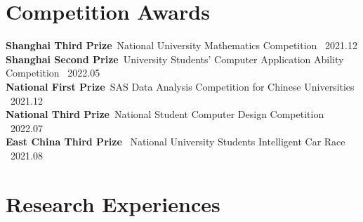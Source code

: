 \documentclass{resume}
\begin{document}
\section{Competition Awards}
\textbf{Shanghai Third Prize}\ {National University Mathematics Competition} \   \hfill 2021.12  \\
\textbf{Shanghai Second Prize}\ {University Students' Computer Application Ability Competition} \  \hfill 2022.05 \\
 \textbf{National First Prize}\ {SAS Data Analysis Competition for Chinese Universities} \ \hfill 2021.12   \\
\textbf{National Third Prize}\ {National Student Computer Design Competition} \  \hfill 2022.07   \\
 \textbf{East China Third Prize} \ {National University Students Intelligent Car Race} \ \hfill 2021.08 






\section{Research Experiences}
\end{document}
